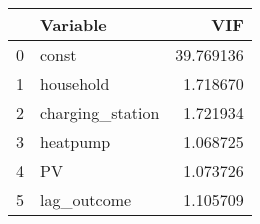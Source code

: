 \begin{tabular}{llr}
\toprule
 & Variable & VIF \\
\midrule
0 & const & 39.769136 \\
1 & household & 1.718670 \\
2 & charging_station & 1.721934 \\
3 & heatpump & 1.068725 \\
4 & PV & 1.073726 \\
5 & lag_outcome & 1.105709 \\
\bottomrule
\end{tabular}
